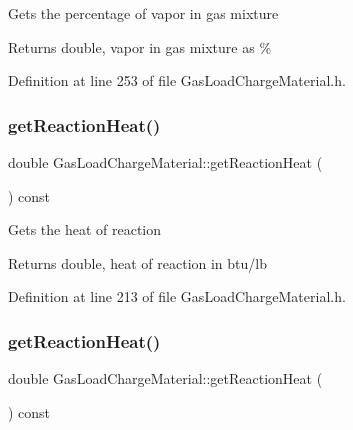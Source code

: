 Gets the percentage of vapor in gas mixture

\begin{DoxyReturn}{Returns}
double, vapor in gas mixture as \% 
\end{DoxyReturn}


Definition at line 253 of file Gas\+Load\+Charge\+Material.\+h.

\mbox{\label{class_gas_load_charge_material_a605eaf21d1f25f27b53627aeb903c93d}} 
\subsubsection{\texorpdfstring{get\+Reaction\+Heat()}{getReactionHeat()}\hspace{0.1cm}{\footnotesize\ttfamily [1/3]}}
{\footnotesize\ttfamily double Gas\+Load\+Charge\+Material\+::get\+Reaction\+Heat (\begin{DoxyParamCaption}{ }\end{DoxyParamCaption}) const\hspace{0.3cm}{\ttfamily [inline]}}

Gets the heat of reaction

\begin{DoxyReturn}{Returns}
double, heat of reaction in btu/lb 
\end{DoxyReturn}


Definition at line 213 of file Gas\+Load\+Charge\+Material.\+h.

\mbox{\label{class_gas_load_charge_material_a605eaf21d1f25f27b53627aeb903c93d}} 
\subsubsection{\texorpdfstring{get\+Reaction\+Heat()}{getReactionHeat()}\hspace{0.1cm}{\footnotesize\ttfamily [2/3]}}
{\footnotesize\ttfamily double Gas\+Load\+Charge\+Material\+::get\+Reaction\+Heat (\begin{DoxyParamCaption}{ }\end{DoxyParamCaption}) const\hspace{0.3cm}{\ttfamily [inline]}}

